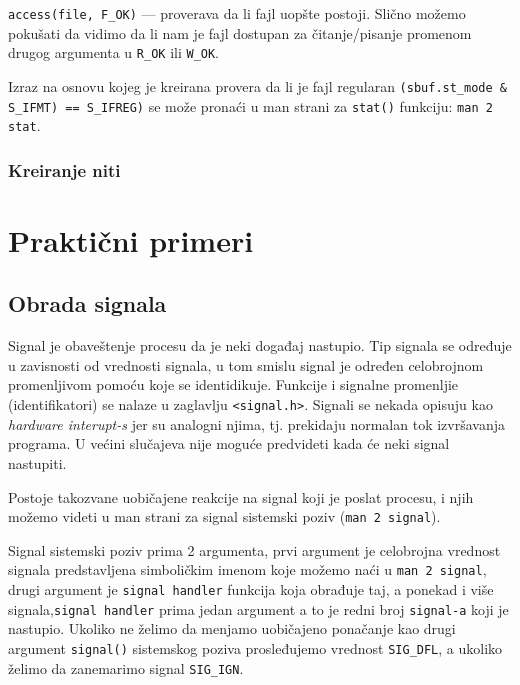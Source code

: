 \documentclass[a4paper, 11pt, twoside]{article}
\newcommand{\scode}[3] {
	\hspace{.06\textwidth} 
	\begin{minipage}[t]{.88\textwidth} %
		\begin{mdframed}[topline=true,bottomline=true,leftline=true,rightline=true,backgroundcolor=gray!22, linecolor=gray!60!black,roundcorner=1mm]
			 

	\begin{center}
		\caption{\textbf{Primer \ref{lst:#3}:} #2}
	\end{center}
	\end{mdframed}
	\end{minipage}

}
\begin{document}
\scode{openerchk.c}{Otvaranje regularnog fajla}{otvorobr}
\vspace{2mm} 

\texttt{access(file, F\_OK)} --- proverava da li fajl uopšte postoji. Slično možemo pokušati da vidimo da li nam je fajl dostupan za čitanje/pisanje promenom drugog argumenta u \texttt{R\_OK} ili \texttt{W\_OK}.

Izraz na osnovu kojeg je kreirana provera da li je fajl regularan \texttt{(sbuf.st\_mode \& S\_IFMT) == S\_IFREG)} se može pronaći u man strani za \texttt{stat()} funkciju: \texttt{man 2 stat}.

\subsubsection{Kreiranje niti}

\scode{pthcrer.c}{Obrada greske za funkcije koje rade sa threadovima}{pthcrer}
 

\newpage

\section{Praktični primeri}

\subsection{Obrada signala}

Signal je obaveštenje procesu da je neki događaj nastupio. Tip signala se određuje u zavisnosti od vrednosti signala, u tom smislu signal je određen celobrojnom promenljivom pomoću koje se identidikuje. Funkcije i signalne promenljie (identifikatori) se nalaze u zaglavlju \texttt{<signal.h>}. Signali se nekada opisuju kao \emph{hardware interupt-s} jer su analogni njima, tj. prekidaju normalan tok izvršavanja programa. U većini slučajeva nije moguće predvideti kada će neki signal nastupiti.

Postoje takozvane uobičajene reakcije na signal koji je poslat procesu, i njih možemo videti u man strani za signal sistemski poziv (\texttt{man 2 signal}).   

Signal sistemski poziv prima 2 argumenta, prvi argument je celobrojna vrednost signala predstavljena simboličkim imenom koje možemo naći u \texttt{man 2 signal}, drugi argument je \texttt{signal handler} funkcija koja obrađuje taj, a ponekad i više signala,\texttt{signal handler} prima jedan argument a to je redni broj \texttt{signal-a} koji je nastupio. Ukoliko ne želimo da menjamo uobičajeno ponačanje kao drugi argument \texttt{signal()} sistemskog poziva prosleđujemo vrednost \texttt{SIG\_DFL}, a ukoliko želimo da zanemarimo signal \texttt{SIG\_IGN}. 
\end{document}
